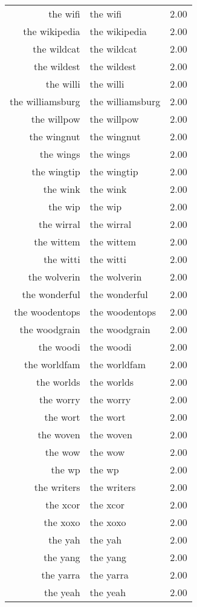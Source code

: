 \begin{table}[ht]
\begin{tabular}{rlr}
  the wifi & the wifi & 2.00 \\ 
  the wikipedia & the wikipedia & 2.00 \\ 
  the wildcat & the wildcat & 2.00 \\ 
  the wildest & the wildest & 2.00 \\ 
  the willi & the willi & 2.00 \\ 
  the williamsburg & the williamsburg & 2.00 \\ 
  the willpow & the willpow & 2.00 \\ 
  the wingnut & the wingnut & 2.00 \\ 
  the wings & the wings & 2.00 \\ 
  the wingtip & the wingtip & 2.00 \\ 
  the wink & the wink & 2.00 \\ 
  the wip & the wip & 2.00 \\ 
  the wirral & the wirral & 2.00 \\ 
  the wittem & the wittem & 2.00 \\ 
  the witti & the witti & 2.00 \\ 
  the wolverin & the wolverin & 2.00 \\ 
  the wonderful & the wonderful & 2.00 \\ 
  the woodentops & the woodentops & 2.00 \\ 
  the woodgrain & the woodgrain & 2.00 \\ 
  the woodi & the woodi & 2.00 \\ 
  the worldfam & the worldfam & 2.00 \\ 
  the worlds & the worlds & 2.00 \\ 
  the worry & the worry & 2.00 \\ 
  the wort & the wort & 2.00 \\ 
  the woven & the woven & 2.00 \\ 
  the wow & the wow & 2.00 \\ 
  the wp & the wp & 2.00 \\ 
  the writers & the writers & 2.00 \\ 
  the xcor & the xcor & 2.00 \\ 
  the xoxo & the xoxo & 2.00 \\ 
  the yah & the yah & 2.00 \\ 
  the yang & the yang & 2.00 \\ 
  the yarra & the yarra & 2.00 \\ 
  the yeah & the yeah & 2.00 \\ 

\end{tabular}
\end{table}
